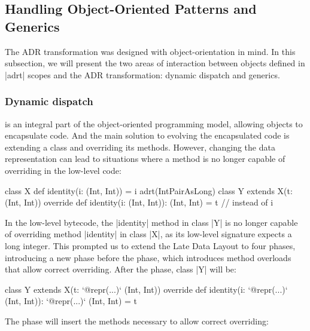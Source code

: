 \subsection{Handling Object-Oriented Patterns and Generics}
\label{sec:ildl:generics}

The ADR transformation was designed with object-orientation in mind. In this subsection, we will present the two areas of interaction between objects defined in |adrt| scopes and the ADR transformation: dynamic dispatch and generics.

\subsubsection{Dynamic dispatch }
is an integral part of the object-oriented programming model, allowing objects to encapsulate code. And the main solution to evolving the encapsulated code is extending a class and overriding its methods. However, changing the data representation can lead to situations where a method is no longer capable of overriding in the low-level code:

\begin{lstlisting-nobreak}
class X {
  def identity(i: (Int, Int)) = i
}
adrt(IntPairAsLong) {
  class Y extends X(t: (Int, Int)) {
    override def identity(i: (Int, Int)): (Int, Int) = t // instead of i
  }
}
\end{lstlisting-nobreak}

In the low-level bytecode, the |identity| method in class |Y| is no longer capable of overriding method |identity| in class |X|, as its low-level signature expects a long integer. This prompted us to extend the Late Data Layout to four phases, introducing a new \bridge{} phase before the \coerce{} phase, which introduces method overloads that allow correct overriding. After the \inject{} phase, class |Y| will be:

\begin{lstlisting-nobreak}
class Y extends X(t: `@repr(...)` (Int, Int)) {
  override def identity(i: `@repr(...)` (Int, Int)): `@repr(...)` (Int, Int) = t
}
\end{lstlisting-nobreak}

The \bridge{} phase will insert the methods necessary to allow correct overriding:

